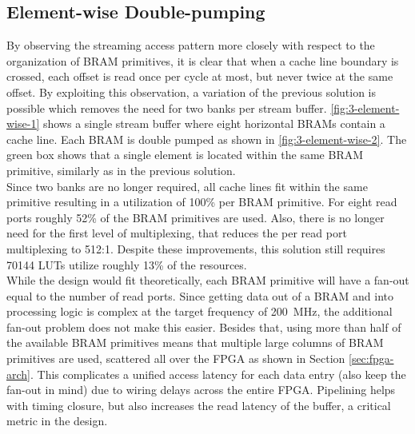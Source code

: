 \subsection{Element-wise Double-pumping}
\label{sec:wise}
By observing the streaming access pattern more closely with respect to the organization of BRAM primitives, it is clear that when a cache line boundary is crossed, each offset is read once per cycle at most, but never twice at the same offset. By exploiting this observation, a variation of the previous solution is possible which removes the need for two banks per stream buffer. \autoref{fig:3-element-wise-1} shows a single stream buffer where eight horizontal BRAMs contain a cache line. Each BRAM is double pumped as shown in \autoref{fig:3-element-wise-2}. The green box shows that a single element is located within the same BRAM primitive, similarly as in the previous solution.\\
Since two banks are no longer required, all cache lines fit within the same primitive resulting in a utilization of 100\% per BRAM primitive. For eight read ports roughly 52\% of the BRAM primitives are used. Also, there is no longer need for the first level of multiplexing, that reduces the per read port multiplexing to 512:1. Despite these improvements, this solution still requires 70144 LUTs utilize roughly 13\% of the resources.\\
While the design would fit theoretically, each BRAM primitive will have a fan-out equal to the number of read ports. Since getting data out of a BRAM and into processing logic is complex at the target frequency of \SI{200}{\mega\hertz}, the additional fan-out problem does not make this easier. Besides that, using more than half of the available BRAM primitives means that multiple large columns of BRAM primitives are used, scattered all over the FPGA as shown in Section \ref{sec:fpga-arch}. This complicates a unified access latency for each data entry (also keep the fan-out in mind) due to wiring delays across the entire FPGA. Pipelining helps with timing closure, but also increases the read latency of the buffer, a critical metric in the design.




